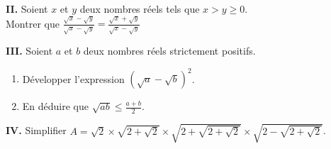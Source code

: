 \documentclass[12pt,a4paper]{article}
\begin{document}
\vspace{0.5em}

\noindent \textbf{II.} Soient $x$ et $y$ deux nombres réels tels que $x > y \geq 0$. \\
Montrer que $\frac{\sqrt{x} - \sqrt{y}}{\sqrt{x} - \sqrt{y}} = \frac{\sqrt{x} + \sqrt{y}}{\sqrt{x} - \sqrt{y}}$
\begin{flushright}
 
\end{flushright}

\vspace{0.5em}

\noindent \textbf{III.} Soient $a$ et $b$ deux nombres réels strictement positifs.
\begin{enumerate}[label=\alph*)]
    \item Développer l'expression $(\sqrt{a} - \sqrt{b})^2$.
    \item En déduire que $\sqrt{ab} \leq \frac{a+b}{2}$.
\end{enumerate}

\vspace{0.5em}

\noindent \textbf{IV.} Simplifier $A = \sqrt{2} \times \sqrt{2+\sqrt{2}} \times \sqrt{2+\sqrt{2+\sqrt{2}}} \times \sqrt{2-\sqrt{2+\sqrt{2}}}$.
\end{document}
